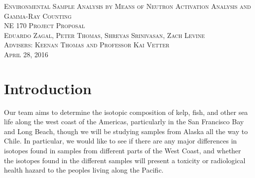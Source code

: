 \documentclass[]{article}
\begin{document}
\doublespacing
{}

\begin{titlepage}
\null{}
\begin{center}
\textsc{\LARGE Environmental Sample Analysis by Means of Neutron Activation Analysis and Gamma-Ray Counting
}\\[1.5cm]

\textsc{\Large NE 170 Project Proposal}\\[0.5cm]
\textsc{\Large Eduardo Zagal, Peter Thomas, Shreyas Srinivasan, Zach Levine}\\[0.5cm] %
\textsc{\Large Advisers: Keenan Thomas and Professor Kai Vetter}\\[0.5cm]
\textsc{\Large April 28, 2016}\\[0.5cm] %
\end{center}
\end{titlepage}
\pagebreak


\tableofcontents

\pagebreak


\singlespacing

\section{Introduction}
Our team aims to determine the isotopic composition of kelp, fish, and other sea life along the west coast of the Americas, particularly in the San Francisco Bay and Long Beach, though we will be studying samples from Alaska all the way to Chile. In particular, we would like to see if there are any major differences in isotopes found in samples from different parts of the West Coast, and whether the isotopes found in the different samples will present a toxicity or radiological health hazard to the peoples living along the Pacific.
\end{document}
